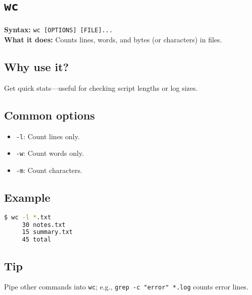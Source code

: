 \documentclass[10pt,oneside]{scrbook}
\begin{document}
\section{\texttt{wc}}
\begin{cmdbox}
  \textbf{Syntax:} \lstinline!wc [OPTIONS] [FILE]...! \\
  \textbf{What it does:} Counts lines, words, and bytes (or characters) in files.
\end{cmdbox}
\begin{commanddetails}
  \subsection*{Why use it?}
    Get quick stats—useful for checking script lengths or log sizes.

  \subsection*{Common options}
  \begin{itemize}
    \item \lstinline!-l!: Count lines only.
    \item \lstinline!-w!: Count words only.
    \item \lstinline!-m!: Count characters.
  \end{itemize}

  \subsection*{Example}
  \begin{lstlisting}[language=bash]
$ wc -l *.txt
     30 notes.txt
     15 summary.txt
     45 total
  \end{lstlisting}

  \subsection*{Tip}
    Pipe other commands into \texttt{wc}; e.g., \lstinline!grep -c "error" *.log! counts error lines.
\end{commanddetails}

\end{document}
